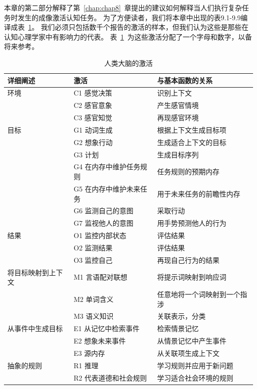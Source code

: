 本章的第二部分解释了第~\ref{chap:chap8}~章提出的建议如何解释当人们执行复杂任务时发生的成像激活认知任务。
为了方便读者，我们将本章中出现的表9.1-9.9编译成表~\ref{tab:9_10}。
我们必须只包括数千个报告的激活的样本，但我们认为这些是那些在认知心理学家中有影响力的代表。
表~\ref{tab:9_10}~为这些激活分配了一个字母和数字，以备将来参考。


\begin{table}[htbp] 
	\newcommand{\tabincell}[2]{\begin{tabular}{@{}#1@{}}#2\end{tabular}} %
	\centering
	\caption{人类大脑的激活\label{tab:9_10}}
	\renewcommand\arraystretch{1.5}	%
	\begin{tabular}{lll}
		\toprule
		详细阐述 & 激活 & 与基本函数的关系\\
		\midrule
		环境 & C1 感觉决策 & 识别上下文  \\
		& C2 感官意象 & 产生感官情境 \\
		& C3 感官知觉 & 再现感官环境 \\
		目标 & G1 动词生成 & 根据上下文生成目标项  \\
		& G2 想象行动 & 生成适合上下文的目标 \\
		& G3 计划 & 生成目标序列 \\
		& G4 在内存中维护任务规则 & 任务规则的预期内存 \\
		& G5 在内存中维护未来任务 & 用于未来任务的前瞻性内存 \\
		& G6 监测自己的意图 & 采取行动 \\
		& G7 监视他人的意图 & 用手势预测他人的行为 \\
		结果 & O1 监控内部状态 & 评估结果  \\
		& O2 监测结果 & 评估结果 \\
		& O3 监控自己 & 再现自己行为的结果 \\
		将目标映射到上下文 & M1 言语配对联想 & 将提示词映射到响应词  \\
		& M2 单词含义 & 任意地将一个词映射到一个指涉 \\
		& M3 语义知识 & 关联表示，分类 \\
		从事件中生成目标 & E1 从记忆中检索事件& 检索情景记忆  \\
		& E2 想象未来事件 & 从情景记忆中产生事件 \\
		& E3 源内存 & 从关联项生成上下文 \\
		抽象的规则  & R1 推理 & 学习规则并应用于新问题  \\
		& R2 代表道德和社会规则 & 学习适合社会环境的规则 \\

		\bottomrule
		
	\end{tabular}%
\end{table}%


